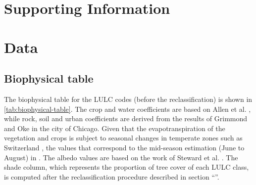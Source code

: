 \documentclass[10pt,letterpaper]{article}
\begin{document}


\section*{Supporting Information}

\setcounter{figure}{0}
\renewcommand{\thefigure}{S\arabic{figure}}
\setcounter{table}{0}
\renewcommand{\thetable}{S\arabic{table}}

\section*{Data}

\subsection*{Biophysical table}
\label{sec:biophysical-table}

The biophysical table for the LULC codes (before the reclassification) is shown in \autoref{tab:biophysical-table}. The crop and water coefficients are based on Allen et al. \cite{allen1998crop}, while rock, soil and urban coefficients are derived from the results of Grimmond and Oke \cite{grimmond1999evapotranspiration} in the city of Chicago. Given that the evapotranspiration of the vegetation and crops is subject to seasonal changes in temperate zones such as Switzerland \cite{allen1998crop}, the values that correspond to the mid-season estimation (June to August) in \cite{nistor2016mapping}.
The albedo values are based on the work of Steward et al. \cite{stewart2012local}.
The shade column, which represents the proportion of tree cover of each LULC class, is computed after the reclassification procedure described in section ``''. %
\end{document}
